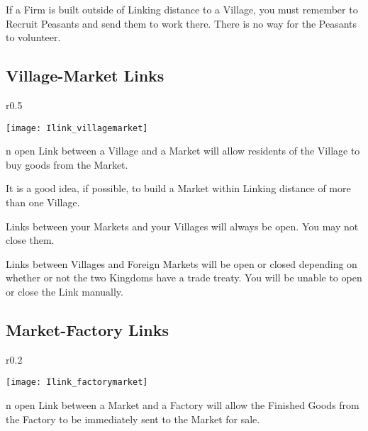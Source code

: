 If a Firm is built outside of Linking distance to a Village, you must remember to Recruit Peasants and send them to work there. There is no way for the Peasants to volunteer.

\subsection{\textsf{Village-Market Links}}


\begin{wrapfigure}{r}{0.5\textwidth}
    \vspace{-20pt}
    \begin{center}
        \texttt{[image: Ilink\_villagemarket]} %
    \end{center}
    \vspace{-20pt}
\end{wrapfigure}

n open Link between a Village and a Market will allow residents of the Village to buy goods from the Market.

It is a good idea, if possible, to build a Market within Linking distance of more than one Village.

Links between your Markets and your Villages will always be open. You may not close them.

Links between Villages and Foreign Markets will be open or closed depending on whether or not the two Kingdoms have a trade treaty. You will be unable to open or close the Link manually.

\subsection{\textsf{Market-Factory Links}}


\begin{wrapfigure}{r}{0.2\textwidth}
    \vspace{-20pt}
    \begin{center}
        \texttt{[image: Ilink\_factorymarket]} %
    \end{center}
    \vspace{-20pt}
\end{wrapfigure}

n open Link between a Market and a Factory will allow the Finished Goods from the Factory to be immediately sent to the Market for sale.

